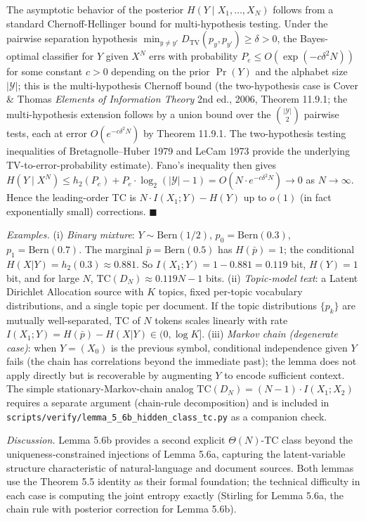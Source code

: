 \documentclass[
]{article}
\begin{document}
The asymptotic behavior of the posterior $H(Y \mid X_1, \ldots, X_N)$
follows from a standard Chernoff-Hellinger bound for multi-hypothesis
testing. Under the pairwise separation hypothesis
$\min_{y \neq y'} D_{\mathrm{TV}}(p_y, p_{y'}) \geq \delta > 0$, the
Bayes-optimal classifier for $Y$ given $X^N$ errs with probability
$P_e \leq O(\exp(-c \delta^2 N))$ for some constant
$c > 0$ depending on the prior $\Pr(Y)$ and the alphabet size
$|\mathcal{Y}|$; this is the multi-hypothesis Chernoff bound (the
two-hypothesis case is Cover \& Thomas \emph{Elements of Information
Theory} 2nd ed., 2006, Theorem 11.9.1; the multi-hypothesis
extension follows by a union bound over the $\binom{|\mathcal{Y}|}{2}$
pairwise tests, each at error $O(e^{-c \delta^2 N})$ by Theorem
11.9.1. The two-hypothesis testing inequalities of Bretagnolle--Huber
1979 and LeCam 1973 provide the underlying TV-to-error-probability
estimate). Fano's inequality then gives
$H(Y \mid X^N) \leq h_2(P_e) + P_e \cdot \log_2(|\mathcal{Y}| - 1)
= O(N \cdot e^{-c\delta^2 N}) \to 0$ as $N \to \infty$.
Hence the leading-order TC is $N \cdot I(X_1; Y) - H(Y)$ up to
$o(1)$ (in fact exponentially small) corrections.
\hfill$\blacksquare$

\emph{Examples.}
(i) \emph{Binary mixture}: $Y \sim \mathrm{Bern}(1/2)$,
$p_0 = \mathrm{Bern}(0.3)$, $p_1 = \mathrm{Bern}(0.7)$. The marginal
$\bar p = \mathrm{Bern}(0.5)$ has $H(\bar p) = 1$; the conditional
$H(X|Y) = h_2(0.3) \approx 0.881$. So
$I(X_1; Y) = 1 - 0.881 = 0.119$ bit, $H(Y) = 1$ bit, and for
large $N$,
$\mathrm{TC}(D_N) \approx 0.119 N - 1$ bits.
(ii) \emph{Topic-model text}: a Latent Dirichlet Allocation source
with $K$ topics, fixed per-topic vocabulary distributions, and a
single topic per document. If the topic distributions $\{p_k\}$ are
mutually well-separated, $\mathrm{TC}$ of $N$ tokens scales linearly
with rate $I(X_1; Y) = H(\bar p) - H(X|Y) \in (0, \log K]$.
(iii) \emph{Markov chain (degenerate case)}: when $Y = (X_0)$ is
the previous symbol, conditional independence given $Y$ fails (the
chain has correlations beyond the immediate past); the lemma does
not apply directly but is recoverable by augmenting $Y$ to encode
sufficient context. The simple stationary-Markov-chain analog
$\mathrm{TC}(D_N) = (N-1) \cdot I(X_1; X_2)$ requires a separate
argument (chain-rule decomposition) and is included in
\texttt{scripts/verify/lemma\_5\_6b\_hidden\_class\_tc.py} as a
companion check.

\emph{Discussion.} Lemma 5.6b provides a second explicit
$\Theta(N)$-TC class beyond the uniqueness-constrained injections
of Lemma 5.6a, capturing the latent-variable structure characteristic
of natural-language and document sources. Both lemmas use the
Theorem 5.5 identity as their formal foundation; the technical
difficulty in each case is computing the joint entropy exactly
(Stirling for Lemma 5.6a, the chain rule with posterior correction
for Lemma 5.6b).
\end{document}
